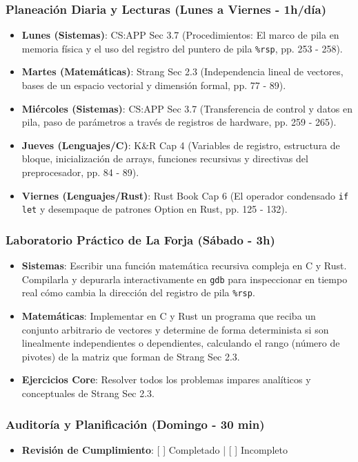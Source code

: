 \documentclass[11pt, a4paper]{article}
\begin{document}
\subsubsection{Planeación Diaria y Lecturas (Lunes a Viernes - 1h/día)}
\begin{itemize}
    \item \textbf{Lunes (Sistemas)}: CS:APP Sec 3.7 (Procedimientos: El marco de pila en memoria física y el uso del registro del puntero de pila \texttt{\%rsp}, pp. 253 - 258).
    \item \textbf{Martes (Matemáticas)}: Strang Sec 2.3 (Independencia lineal de vectores, bases de un espacio vectorial y dimensión formal, pp. 77 - 89).
    \item \textbf{Miércoles (Sistemas)}: CS:APP Sec 3.7 (Transferencia de control y datos en pila, paso de parámetros a través de registros de hardware, pp. 259 - 265).
    \item \textbf{Jueves (Lenguajes/C)}: K\&R Cap 4 (Variables de registro, estructura de bloque, inicialización de arrays, funciones recursivas y directivas del preprocesador, pp. 84 - 89).
    \item \textbf{Viernes (Lenguajes/Rust)}: Rust Book Cap 6 (El operador condensado \texttt{if let} y desempaque de patrones Option en Rust, pp. 125 - 132).
\end{itemize}

\subsubsection{Laboratorio Práctico de La Forja (Sábado - 3h)}
\begin{itemize}
    \item \textbf{Sistemas}: Escribir una función matemática recursiva compleja en C y Rust. Compilarla y depurarla interactivamente en \texttt{gdb} para inspeccionar en tiempo real cómo cambia la dirección del registro de pila \texttt{\%rsp}.
    \item \textbf{Matemáticas}: Implementar en C y Rust un programa que reciba un conjunto arbitrario de vectores y determine de forma determinista si son linealmente independientes o dependientes, calculando el rango (número de pivotes) de la matriz que forman de Strang Sec 2.3.
    \item \textbf{Ejercicios Core}: Resolver todos los problemas impares analíticos y conceptuales de Strang Sec 2.3.
\end{itemize}

\subsubsection{Auditoría y Planificación (Domingo - 30 min)}
\begin{itemize}
    \item \textbf{Revisión de Cumplimiento}: [ ] Completado | [ ] Incompleto
\end{itemize}
\end{document}
